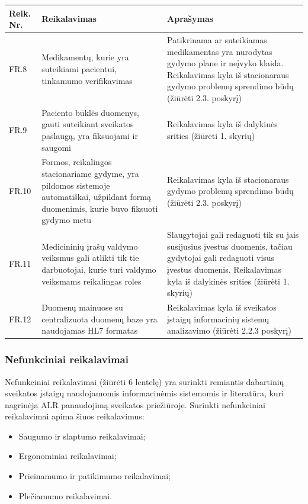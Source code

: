 \begin{table}[!ht]
    \centering
    \renewcommand{\arraystretch}{1.2}
    \renewcommand\thetable{5}

    \begin{tabular}{|m{3em}|m{17em}|m{17em}|}
    \hline 
    \rowcolor[HTML]{EFEFEF} 
    Reik. Nr. & Reikalavimas & Aprašymas \\ \hline
    FR.8  &  Medikamentų, kurie yra suteikiami pacientui, tinkamumo verifikavimas   &  Patikrinama ar suteikiamas medikamentas yra nurodytas gydymo plane ir neįvyko klaida. Reikalavimas kyla iš stacionaraus gydymo problemų sprendimo būdų  (žiūrėti 2.3. poskyrį)       \\ \hline
    FR.9  &  Paciento būklės duomenys, gauti suteikiant sveikatos paslaugą, yra fiksuojami ir saugomi  &    Reikalavimas kyla iš dalykinės srities (žiūrėti 1. skyrių)       \\ \hline
    FR.10  &  Formos, reikalingos stacionariame gydyme, yra pildomos sistemoje automatiškai, užpildant formą duomenimis, kurie buvo fiksuoti gydymo metu  &   Reikalavimas kyla iš stacionaraus gydymo problemų sprendimo būdų  (žiūrėti 2.3. poskyrį)       \\ \hline
    FR.11  &  Medicininių įrašų valdymo veiksmus gali atlikti tik tie darbuotojai, kurie turi valdymo veiksmams reikalingas roles  &  
    Slaugytojai gali redaguoti tik su jais susijusius įvestus duomenis, tačiau gydytojai gali redaguoti visus įvestus duomenis. Reikalavimas kyla iš dalykinės srities (žiūrėti 1. skyrių)       \\ \hline
    FR.12  &  Duomenų mainuose su centralizuota duomenų baze yra naudojamas HL7 formatas  &   Reikalavimas kyla iš sveikatos įstaigų informacinių sistemų analizavimo (žiūrėti 2.2.3 poskyrį)       \\ \hline
    \end{tabular}

\end{table}


\subsubsection{Nefunkciniai reikalavimai}
Nefunkciniai reikalavimai (žiūrėti 6 lentelę) yra surinkti remiantis dabartinių sveikatos įstaigų naudojamomis informacinėmis sistemomis ir literatūra, kuri nagrinėja ALR panaudojimą sveikatos priežiūroje. Surinkti nefunkciniai reikalavimai apima šiuos reikalavimus:
\begin{itemize}
    \item Saugumo ir slaptumo reikalavimai;
    \item Ergonominiai reikalavimai;
    \item Prieinamumo ir patikimumo reikalavimai;
    \item Plečiamumo reikalavimai.
\end{itemize}

